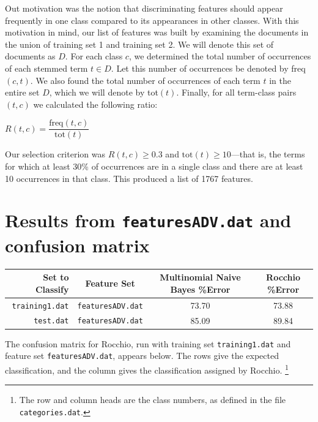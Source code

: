 \documentclass[11pt]{article}
\begin{document}
Out motivation was the notion that discriminating features should appear frequently in one class compared to its appearances in
other classes. With this motivation in mind, our list of features was built by examining the documents in the union of
training set 1 and training set 2. We will denote this set of documents as $D$.
For each class $c$, we determined the total number of occurrences of each stemmed term $t \in D$.
Let this number of occurrences be denoted by freq$(c, t)$. We also found the total number of occurrences of each term $t$ in the entire
set $D$, which we will denote by tot$(t)$. Finally, for all term-class pairs $(t, c)$ we calculated the following ratio:

\centering
\begin{math}
R(t, c) = \dfrac{\text{freq}(t, c)}{\text{tot}(t)}
\end{math}
\flushleft

Our selection criterion was $R(t, c) \geq 0.3$ and $\text{tot}(t) \geq 10$---that is, the terms for which
at least 30\% of occurrences are in a single class and there are at least 10 occurrences in that class.
This produced a list of 1767 features.


\section{Results from \texttt{featuresADV.dat} and confusion matrix}

\centering
\begin{tabular}{r|c|c|c}
\textbf{Set to Classify} & \textbf{Feature Set} & \textbf{Multinomial Naive Bayes \%Error} & \textbf{Rocchio \%Error} \\
\hline
\texttt{training1.dat} & \texttt{featuresADV.dat} & 73.70 & 73.88 \\
\texttt{test.dat} & \texttt{featuresADV.dat} & 85.09 & 89.84 \\
\end{tabular}
\flushleft

The confusion matrix for Rocchio, run with training set \texttt{training1.dat} and
feature set \texttt{featuresADV.dat}, appears below. The rows give the expected
classification, and the column gives the classification assigned by Rocchio.
\footnote{The row and column heads are the class numbers, as defined in the
file \texttt{categories.dat}.}
\end{document}
